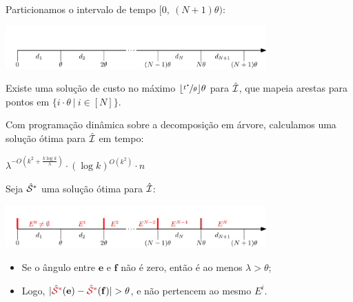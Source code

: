 \begin{frame}{}
    \centering
    Particionamos o intervalo de tempo $[0,\ (N+1) \theta)$:

    \pause
    \vspace*{2cm}
    \begin{minipage}{\linewidth}
        \centering
        \includegraphics[width=10cm]{MSC/interval.png}
    \end{minipage}
\end{frame}

\begin{frame}{}
    \begin{lem}
        \label{lemma:1}
        Existe uma solução de custo no máximo $\lfloor\nicefrac{t^*}{\theta}\rfloor \theta$ para $\hat {\mathcal{I}}$, que mapeia arestas para pontos em $\{i\cdot \theta\ |\ i \in [N]\}$.
    \end{lem}
\end{frame}

\begin{frame}{}
    Com programação dinâmica sobre a decomposição em árvore, calculamos uma solução ótima para $\hat{\mathcal{I}}$ em tempo:

    \bigskip
    \centering
    $\lambda^{-O(k^2+\frac{k\log k}{\lambda})}\cdot (\log k)^{O(k^2)}\cdot n$
\end{frame}

\begin{frame}{}
    \centering
    Seja {\color{red} $\hat {\mathcal{S}}^*$} uma solução ótima para $\hat {\mathcal{I}}$:

    \begin{minipage}{\linewidth}
        \vspace*{2cm}
        \centering
        \includegraphics[width=10cm]{MSC/final/final_1.png}
    \end{minipage}
\end{frame}

\begin{frame}{}
    \centering
    \begin{obs}
        \begin{itemize}[<+->]
            \item Se o ângulo entre $\mathbf{e}$ e $\mathbf{f}$ não é zero, então é ao menos $\lambda > \theta$;
            
            \item Logo, $|{\color{red} \hat \cals^*}(\mathbf{e})-{\color{red} \hat \cals^*}(\mathbf{f})|> \theta$, e não pertencem ao mesmo $E^i$.
        \end{itemize}
    \end{obs}
\end{frame}

